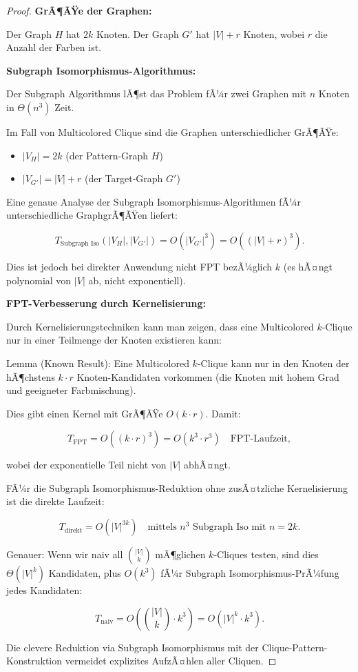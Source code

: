 ﻿\documentclass[a4paper,12pt]{article}
\theoremstyle{definition}
\begin{document}
\begin{proof}
	\textbf{GrÃ¶ÃŸe der Graphen:}
	
	Der Graph $H$ hat $2k$ Knoten.
	Der Graph $G'$ hat $|V| + r$ Knoten, wobei $r$ die Anzahl der Farben ist.
	
	\textbf{Subgraph Isomorphismus-Algorithmus:}
	
	Der Subgraph Algorithmus lÃ¶st das Problem fÃ¼r zwei Graphen mit $n$ Knoten in $\Theta(n^3)$ Zeit.
	
	Im Fall von Multicolored Clique sind die Graphen unterschiedlicher GrÃ¶ÃŸe:
	\begin{itemize}
		\item $|V_H| = 2k$ (der Pattern-Graph $H$)
		\item $|V_{G'}| = |V| + r$ (der Target-Graph $G'$)
	\end{itemize}
	
	Eine genaue Analyse der Subgraph Isomorphismus-Algorithmen fÃ¼r unterschiedliche GraphgrÃ¶ÃŸen liefert:
	
	\[
	T_{\text{Subgraph Iso}}(|V_H|, |V_{G'}|) = O(|V_{G'}|^3) = O((|V| + r)^3).
	\]
	
	Dies ist jedoch bei direkter Anwendung nicht FPT bezÃ¼glich $k$ (es hÃ¤ngt polynomial von $|V|$ ab, nicht exponentiell).
	
	\textbf{FPT-Verbesserung durch Kernelisierung:}
	
	Durch Kernelisierungstechniken kann man zeigen, dass eine Multicolored $k$-Clique nur in einer Teilmenge der Knoten existieren kann:
	
	Lemma (Known Result): Eine Multicolored $k$-Clique kann nur in den Knoten der hÃ¶chstens $k \cdot r$ Knoten-Kandidaten vorkommen (die Knoten mit hohem Grad und geeigneter Farbmischung).
	
	Dies gibt einen Kernel mit GrÃ¶ÃŸe $O(k \cdot r)$. Damit:
	
	\[
	T_{\text{FPT}} = O((k \cdot r)^3) = O(k^3 \cdot r^3) \quad \text{FPT-Laufzeit},
	\]
	
	wobei der exponentielle Teil nicht von $|V|$ abhÃ¤ngt.
	
	FÃ¼r die Subgraph Isomorphismus-Reduktion ohne zusÃ¤tzliche Kernelisierung ist die direkte Laufzeit:
	
	\[
	T_{\text{direkt}} = O(|V|^{3k}) \quad \text{mittels } n^3 \text{ Subgraph Iso mit } n = 2k.
	\]
	
	Genauer: Wenn wir naiv all ${|V| \choose k}$ mÃ¶glichen $k$-Cliques testen, sind dies $\Theta(|V|^k)$ Kandidaten, plus $O(k^3)$ fÃ¼r Subgraph Isomorphismus-PrÃ¼fung jedes Kandidaten:
	
	\[
	T_{\text{naiv}} = O({|V| \choose k} \cdot k^3) = O(|V|^k \cdot k^3).
	\]
	
	Die clevere Reduktion via Subgraph Isomorphismus mit der Clique-Pattern-Konstruktion vermeidet explizites AufzÃ¤hlen aller Cliquen.
\end{proof}
\end{document}
